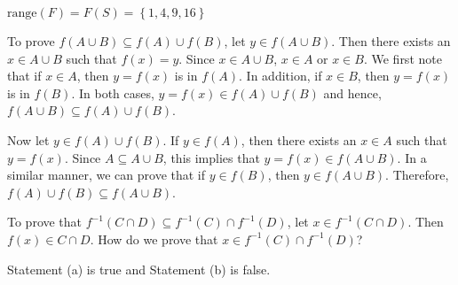\begin{list}{\bf{\ref{exer:sec91-4}.}}
\item \begin{list}{\bf{(a)}}
\item $\text{range} ( F ) = F ( S ) = \left\{1, 4, 9, 16 \right\}$
\end{list}
\end{list}

\begin{list}{\bf{\ref{exer:sec91-5}.}}
\item To prove $f \left( A \cup B \right) \subseteq f \left( A \right) \cup f \left( B \right)$, let $y \in f \left( A \cup B \right)$.  Then there exists an $x \in A \cup B$ such that $f \left( x \right) = y$.  Since $x \in A \cup B$, $x \in A$ or $x \in B$.  We first note that if $x \in A$, then $y = f \left( x \right)$ is in $f \left( A \right)$.  In addition, if $x \in B$, then $y = f \left( x \right)$ is in $f \left( B \right)$.
In both cases, $y = f \left( x \right) \in f \left( A \right) \cup f \left( B \right)$ and hence, 
$f \left( A \cup B \right) \subseteq f \left( A \right) \cup f \left( B \right)$.

Now let $y \in f \left( A \right) \cup f \left( B \right)$.  If $y \in f \left( A \right)$, then there exists an $x \in A$ such that $y = f \left( x \right)$.  Since $A \subseteq A \cup B$, this implies that $y = f \left( x \right) \in f \left( A \cup B \right)$.  In a similar manner, we can prove that if $y \in f \left( B \right)$, then $y \in f \left( A \cup B \right)$.  Therefore, 
$f \left( A \right) \cup f \left( B \right) \subseteq f \left( A \cup B \right)$.
\end{list}

\begin{list}{\bf{\ref{exer:sec91-6}.}}
\item To prove that 
$f^{-1} ( C \cap D ) \subseteq f^{-1} ( C ) \cap f^{-1} ( D )$, let $x \in f^{-1} ( C \cap D )$.  Then $f(x) \in C \cap D$.  How do we prove that 
$x \in f^{-1} ( C ) \cap f^{-1} ( D )$?
\end{list}


\begin{list}{\bf{\ref{exer:invimagetruefalse}.}}
\item Statement (a) is true and Statement (b) is false.
\end{list}
\hbreak

\endinput


